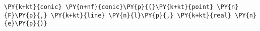 \begin{Verbatim}[commandchars=\\\{\}]
    \PY{k+kt}{conic} \PY{n+nf}{conic}\PY{p}{(}\PY{k+kt}{point} \PY{n}{F}\PY{p}{,} \PY{k+kt}{line} \PY{n}{l}\PY{p}{,} \PY{k+kt}{real} \PY{n}{e}\PY{p}{)}
\end{Verbatim}
